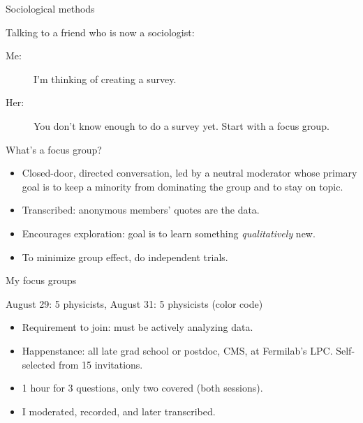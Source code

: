 \documentclass{beamer}
\begin{document}
\begin{frame}{Sociological methods}
\vspace{0.5 cm}
\begin{block}{Talking to a friend who is now a sociologist:}
\begin{description}
\item[Me:] I'm thinking of creating a survey.

\item[Her:] You don't know enough to do a survey yet. Start with a focus group.
\end{description}
\end{block}

\begin{block}{What's a focus group?}
\begin{itemize}
\item Closed-door, directed conversation, led by a neutral moderator whose primary goal is to keep a minority from dominating the group and to stay on topic.

\item Transcribed: anonymous members' quotes are the data.

\item Encourages exploration: goal is to learn something {\it qualitatively} new.

\item To minimize group effect, do independent trials.
\end{itemize}
\end{block}
\end{frame}

\begin{frame}{My focus groups}

\textcolor{aug29}{August 29: 5 physicists}, \textcolor{aug31}{August 31: 5 physicists} (color code)

\begin{itemize}
\item Requirement to join: must be actively analyzing data.
\item Happenstance: all late grad school or postdoc, CMS, at Fermilab's LPC. Self-selected from 15 invitations.

\item 1 hour for 3 questions, only two covered (both sessions).
\item I moderated, recorded, and later transcribed.
\end{itemize}
\end{frame}
\end{document}
